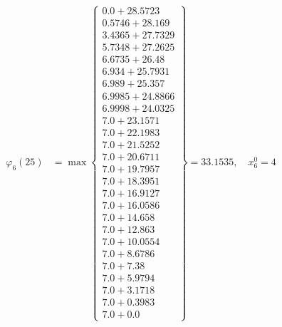 \documentclass{article}
\begin{document}
\begin{align*}
\varphi_{6}(25) &= \max \left\{ \begin{array}{c}
0.0 + 28.5723 \\
 0.5746 + 28.169 \\
 3.4365 + 27.7329 \\
 5.7348 + 27.2625 \\
 6.6735 + 26.48 \\
 6.934 + 25.7931 \\
 6.989 + 25.357 \\
 6.9985 + 24.8866 \\
 6.9998 + 24.0325 \\
 7.0 + 23.1571 \\
 7.0 + 22.1983 \\
 7.0 + 21.5252 \\
 7.0 + 20.6711 \\
 7.0 + 19.7957 \\
 7.0 + 18.3951 \\
 7.0 + 16.9127 \\
 7.0 + 16.0586 \\
 7.0 + 14.658 \\
 7.0 + 12.863 \\
 7.0 + 10.0554 \\
 7.0 + 8.6786 \\
 7.0 + 7.38 \\
 7.0 + 5.9794 \\
 7.0 + 3.1718 \\
 7.0 + 0.3983 \\
 7.0 + 0.0
\end{array} \right\}=33.1535, \quad x_{6}^0=4\\
  

\end{align*}
\end{document}
